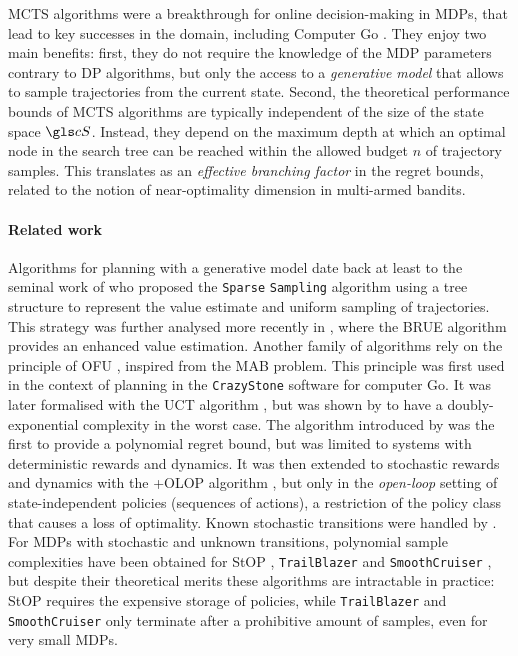 \gls{MCTS} algorithms were a breakthrough for online decision-making in \glspl{MDP}, that lead to key successes in the domain, including Computer Go \citep{Coulom2006,Silver2018}. They enjoy two main benefits: first, they do not require the knowledge of the \gls{MDP} parameters contrary to \eg \gls{DP} algorithms, but only the access to a \emph{generative model} that allows to sample trajectories from the current state. Second, the theoretical performance bounds of \gls{MCTS} algorithms are typically independent of the size of the state space $\cS$. Instead, they depend on the maximum depth at which an optimal node in the search tree can be reached within the allowed budget $n$ of trajectory samples. This translates as an \emph{effective branching factor} in the regret bounds, related to the notion of near-optimality dimension in multi-armed bandits.

\paragraph{Related work}
Algorithms for planning with a generative model date back at least to the seminal work of \citet{Kearns02SS} who proposed the \texttt{Sparse} \texttt{Sampling} algorithm using a tree structure to represent the value estimate and uniform sampling of trajectories. This strategy was further analysed more recently in \citep{Feldman14BRUE}, where the \gls{BRUE} algorithm provides an enhanced value estimation. Another family of algorithms rely on the principle of \gls*{OFU} \citep[surveyed by][]{Munos2014}, inspired from the \gls*{MAB} problem. This principle was first used in the context of planning in the \texttt{CrazyStone} software \citep{Coulom2006} for computer Go. It was later formalised with the \gls{UCT} algorithm \citep{Kocsis2006}, but was shown by \citet{Coquelin2007} to have a doubly-exponential complexity in the worst case. The \OPD algorithm introduced by \citet{Hren2008} was the first to provide a polynomial regret bound, but was limited to systems with deterministic rewards and dynamics. It was then extended to stochastic rewards and dynamics with the \glsxtrfull+{OLOP} algorithm \citep{Bubeck2010}, but only in the \emph{open-loop} setting of state-independent policies (\ie sequences of actions), a restriction of the policy class that causes a loss of optimality.
Known stochastic transitions were handled by \citet{Busoniu2012optimistic}. For \glspl{MDP} with stochastic and unknown transitions, polynomial sample complexities have been obtained for \gls{StOP} \citep{Szorenyi2014}, \texttt{TrailBlazer} \citep{Grill2016} and \texttt{SmoothCruiser} \citep{Grill2019}, but despite their theoretical merits these algorithms are intractable in practice: \gls{StOP} requires the expensive storage of policies, while \texttt{TrailBlazer} and \texttt{SmoothCruiser} only terminate after a prohibitive amount of samples, even for very small \glspl{MDP}. %

